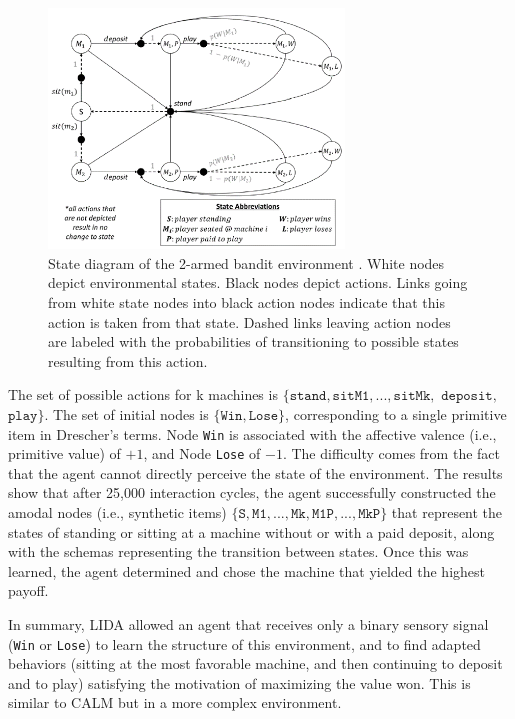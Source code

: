 \documentclass[runningheads]{llncs}
\begin{document}
\begin{figure}
	\centering
	\includegraphics[width=0.7\textwidth]{Figure_LIDA_bench.png}
	\caption{State diagram of the 2-armed bandit environment \cite[Fig. 5]{kugele_constructivist_2025}.
	White nodes depict environmental states.
	Black nodes depict actions. 
	Links going from white state nodes into black action nodes indicate that this action is taken from that state. 
	Dashed links leaving action nodes are labeled with the probabilities of transitioning to possible states resulting from this action.} 
	\label{fig:lida_bench}
\end{figure}

The set of possible actions for k machines is $\{ \texttt{stand}, \texttt{sitM1},..., \texttt{sitMk},$ $\texttt{deposit},$ $\texttt{play} \}$. 
The set of initial nodes is $\{\texttt{Win}, \texttt{Lose} \}$, corresponding to a single primitive item in Drescher's terms.
Node \texttt{Win} is associated with the affective valence (i.e., primitive value) of $+1$, and Node \texttt{Lose} of $-1$.   
The difficulty comes from the fact that the agent cannot directly perceive the state of the environment.
The results show that after 25,000 interaction cycles, the agent successfully constructed the amodal nodes (i.e., synthetic items) $\{ \texttt{S}, \texttt{M1},  ..., \texttt{Mk}, \texttt{M1P}, ...,  \texttt{MkP} \}$ that represent the states of standing or sitting at a machine without or with a paid deposit, along with the schemas representing the transition between states. 
Once this was learned, the agent determined and chose the machine that yielded the highest payoff.

In summary, LIDA allowed an agent that receives only a binary sensory signal (\texttt{Win} or \texttt{Lose}) to learn the structure of this environment, and to find adapted behaviors (sitting at the most favorable machine, and then continuing to deposit and to play) satisfying the motivation of maximizing the value won. 
This is similar to CALM but in a more complex environment.
\end{document}
